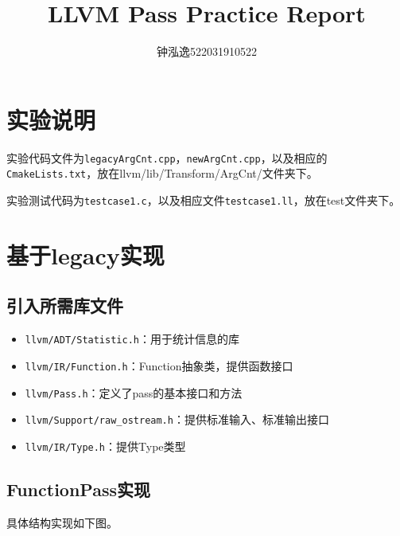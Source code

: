 \documentclass[11pt, a4paper, oneside,UTF8]{ctexart}
\title{\textbf{LLVM Pass Practice Report}}
\author{钟泓逸522031910522}
\date{}%
\begin{document}
\setcounter{page}{1}

\maketitle
\vspace{-\baselineskip}
\thispagestyle{fancy}

\section{实验说明}
实验代码文件为\texttt{legacyArgCnt.cpp}，\texttt{newArgCnt.cpp}，以及相应的\texttt{CmakeLists.txt}，放在llvm/lib/Transform/ArgCnt/文件夹下。

实验测试代码为\texttt{testcase1.c}，以及相应文件\texttt{testcase1.ll}，放在test文件夹下。

\section{基于legacy实现}

\subsection{引入所需库文件}


\begin{itemize}
    \setlength{\itemsep}{-1.0em}
    \item \texttt{llvm/ADT/Statistic.h}：用于统计信息的库
    \item \texttt{llvm/IR/Function.h}：Function抽象类，提供函数接口
    \item \texttt{llvm/Pass.h}：定义了pass的基本接口和方法
    \item \texttt{llvm/Support/raw\_ostream.h}：提供标准输入、标准输出接口
    \item \texttt{llvm/IR/Type.h}：提供Type类型
\end{itemize}

\subsection{FunctionPass实现}

具体结构实现如下图。
\end{document}
